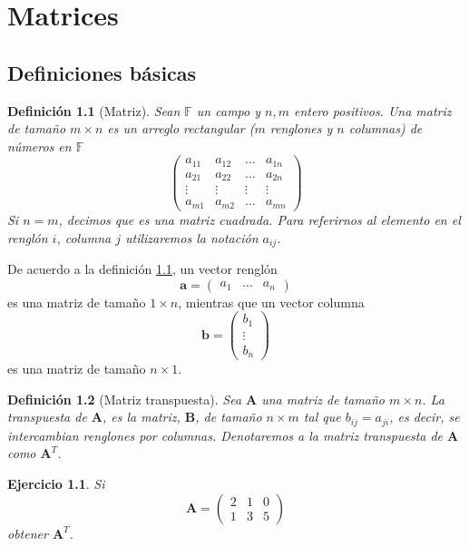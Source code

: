 \documentclass[11pt]{report}
\theoremstyle{break}
\newtheorem{definicion}{Definición}[chapter]
\newtheorem{ejercicio}{Ejercicio}[chapter]
\theoremstyle{break}
\newcommand{\mbb}[1]{$\mathbb{#1}$}
\newcommand{\matdim}[2]{$#1 \times #2$}
\begin{document}
\chapter{Matrices}
\label{capitulo:matrices}
\section{Definiciones básicas}
\label{seccion:matrices-deficiones-basicas}
\begin{definicion}[Matriz]
\label{definicion:matriz}
Sean \mbb{F} un campo y $n,m$ entero positivos. Una matriz de tamaño \matdim{m}{n} es un arreglo rectangular ($m$ renglones y $n$ columnas) de números en \mbb{F}
$$
\begin{pmatrix}
a_{11} & a_{12} & \ldots & a_{1n} \\
a_{21} & a_{22} & \ldots & a_{2n} \\
\vdots & \vdots & \vdots & \vdots \\
a_{m1} & a_{m2} & \ldots & a_{mn}
\end{pmatrix}
$$
Si $n=m$, decimos que es una matriz cuadrada. Para referirnos al elemento en el renglón $i$, columna $j$ utilizaremos la notación $a_{ij}$.
\end{definicion}
De acuerdo a la definición \ref{definicion:matriz}, un vector renglón
$$ \bm{a} = 
\begin{pmatrix}
a_{1} & \ldots & a_{n}
\end{pmatrix}
$$
es una matriz de tamaño \matdim{1}{n}, mientras que un vector columna
$$
\bm{b} = 
\begin{pmatrix}
b_{1} \\
\vdots \\
b_{n}
\end{pmatrix}
$$
es una matriz de tamaño \matdim{n}{1}.

\begin{definicion}[Matriz transpuesta]
\label{definicion:matriz-transpuesta}
Sea $\bm{A}$ una matriz de tamaño \matdim{m}{n}. La transpuesta de $\bm{A}$, es la matriz, $\bm{B}$, de tamaño \matdim{n}{m} tal que $b_{ij} = a_{ji}$, es decir, se intercambian renglones por columnas.
Denotaremos a la matriz transpuesta de $\bm{A}$ como $\bm{A}^{T}$.
\end{definicion}

\begin{ejercicio}
Si 
$$
\bm{A} = 
\begin{pmatrix}
2  & 1 & 0 \\
1 & 3 & 5
\end{pmatrix}
$$
obtener $\bm{A}^T$.
\end{ejercicio}
\end{document}
